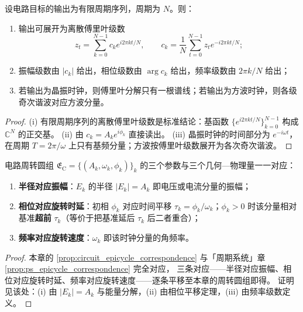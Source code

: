 \begin{theorem}[由电路数据构建周期级数]\label{thm:circuit_series_reconstruction}
设电路目标的输出为有限周期序列，周期为 $N$。则：
\begin{enumerate}[label=(\roman*)]
    \item 输出可展开为离散傅里叶级数
    \[
    z_t=\sum_{k=0}^{N-1}c_k e^{i2\pi kt/N},\qquad
    c_k=\frac1N\sum_{t=0}^{N-1}z_t e^{-i2\pi kt/N};
    \]
    \item 振幅级数由 $|c_k|$ 给出，相位级数由 $\arg c_k$ 给出，频率级数由 $2\pi k/N$ 给出；
    \item 若输出为晶振时钟，则傅里叶分解只有一根谱线；若输出为方波时钟，则各级奇次谐波对应方波分量。
\end{enumerate}
\end{theorem}

\begin{proof}
(i) 有限周期序列的离散傅里叶级数是标准结论：基函数 $\{e^{i2\pi kt/N}\}_{k=0}^{N-1}$ 构成 $\mathbb C^N$ 的正交基。
(ii) 由 $c_k=A_k e^{i\phi_k}$ 直接读出。
(iii) 晶振时钟的时间部分为 $e^{-i\omega t}$，在周期 $T=2\pi/\omega$ 上只有基频分量；方波按傅里叶级数展开为各次奇次谐波。
\end{proof}

\begin{proposition}\label{prop:circuit_epicycle_correspondence}
电路周转圆组 $\mathfrak E_{\mathrm{C}}=\{(A_k,\omega_k,\phi_k)\}_{k}$ 的三个参数与三个几何—物理量一一对应：
\begin{enumerate}[label=(\roman*)]
    \item \textbf{半径对应振幅}：$E_k$ 的半径 $|E_k|=A_k$ 即电压或电流分量的振幅；
    \item \textbf{相位对应旋转时延}：初相 $\phi_k$ 对应时间平移 $\tau_k=\phi_k/\omega_k$；$\phi_k>0$ 时该分量相对基准\textbf{超前} $\tau_k$（等价于把基准延后 $\tau_k$ 后二者重合）；
    \item \textbf{频率对应旋转速度}：$\omega_k$ 即该时钟分量的角频率。
\end{enumerate}
\end{proposition}

\begin{proof}
本章的 \cref{prop:circuit_epicycle_correspondence} 与「周期系统」章 \cref{prop:ps_epicycle_correspondence} 完全对应，
三条对应——半径对应振幅、相位对应旋转时延、频率对应旋转速度——逐条平移至本章的周转圆组即得。
证明见该处：(i) 由 $|E_k|=A_k$ 与能量分解，(ii) 由相位平移定理，(iii) 由频率级数定义。
\end{proof}

